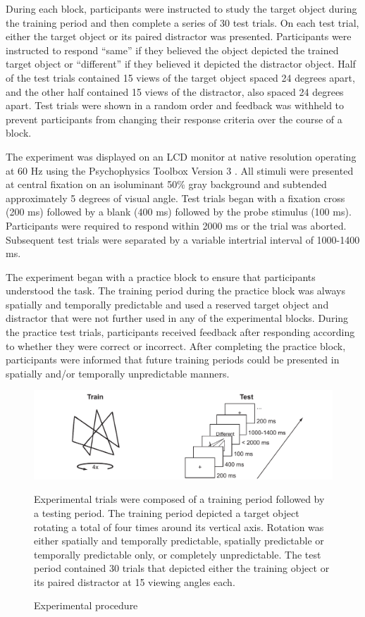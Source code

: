 \documentclass[dwyatte_dissertation.tex]{subfiles}
\begin{document}
During each block, participants were instructed to study the target object during the training period and then complete a series of 30 test trials. On each test trial, either the target object or its paired distractor was presented. Participants were instructed to respond ``same'' if they believed the object depicted the trained target object or ``different'' if they believed it depicted the distractor object. Half of the test trials contained 15 views of the target object spaced 24 degrees apart, and the other half contained 15 views of the distractor, also spaced 24 degrees apart. Test trials were shown in a random order and feedback was withheld to prevent participants from changing their response criteria over the course of a block. 

The experiment was displayed on an LCD monitor at native resolution operating at 60 Hz using the Psychophysics Toolbox Version 3 \cite{Brainard97,Pelli97}. All stimuli were presented at central fixation on an isoluminant 50\% gray background and subtended approximately 5 degrees of visual angle. Test trials began with a fixation cross (200 ms) followed by a blank (400 ms) followed by the probe stimulus (100 ms). Participants were required to respond within 2000 ms or the trial was aborted. Subsequent test trials were separated by a variable intertrial interval of 1000-1400 ms.

The experiment began with a practice block to ensure that participants understood the task. The training period during the practice block was always spatially and temporally predictable and used a reserved target object and distractor that were not further used in any of the experimental blocks. During the practice test trials, participants received feedback after responding according to whether they were correct or incorrect. After completing the practice block, participants were informed that future training periods could be presented in spatially and/or temporally unpredictable manners.

\begin{figure}[h!]
\includegraphics[width=160mm]{figs/chap_bpleast/paperclip_task.pdf} \\
\caption{Experimental procedure}{Experimental trials were composed of a training period followed by a testing period. The training period depicted a target object rotating a total of four times around its vertical axis. Rotation was either spatially and temporally predictable, spatially predictable or temporally predictable only, or completely unpredictable. The test period contained 30 trials that depicted either the training object or its paired distractor at 15 viewing angles each.}
\label{fig:bpleast_task}
\end{figure}
\end{document}
